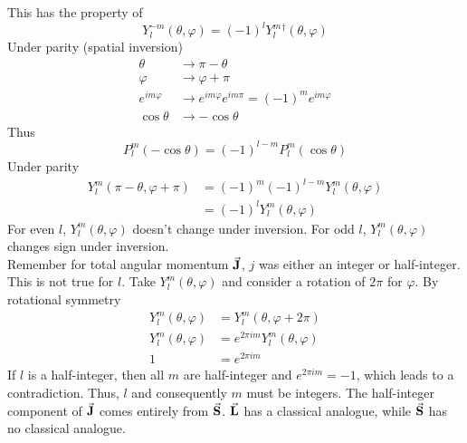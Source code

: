 \documentclass[12pt,a4paper,titlepage]{article}
\begin{document}
This has the property of
\begin{equation}
Y_{l}^{-m}(\theta,\varphi)=(-1)^{l}Y_{l}^{m}{}^{\dagger}(\theta,\varphi)
\end{equation}
Under parity (spatial inversion)
\begin{equation}
\begin{aligned}
\theta&\rightarrow\pi-\theta\\
\varphi&\rightarrow\varphi+\pi\\
e^{im\varphi}&\rightarrow e^{im\varphi}e^{im\pi}=(-1)^{m}e^{im\varphi}\\
\cos\theta&\rightarrow-\cos\theta
\end{aligned}
\end{equation}
Thus
\begin{equation}
P_{l}^{m}(-\cos\theta)=(-1)^{l-m}P_{l}^{m}(\cos\theta)
\end{equation}
Under parity
\begin{equation}
\begin{aligned}
Y_{l}^{m}(\pi-\theta,\varphi+\pi)&=(-1)^{m}(-1)^{l-m}Y_{l}^{m}(\theta,\varphi)\\
&=(-1)^{l}Y_{l}^{m}(\theta,\varphi)
\end{aligned}
\end{equation}
For even $l$, $Y_{l}^{m}(\theta,\varphi)$ doesn't change under inversion. For odd $l$, $Y_{l}^{m}(\theta,\varphi)$ changes sign under inversion.\\

Remember for total angular momentum $\vec{\vb{J}}$, $j$ was either an integer or half-integer. This is not true for $l$. Take $Y_{l}^{m}(\theta,\varphi)$ and consider a rotation of $2\pi$ for $\varphi$. By rotational symmetry
\begin{equation}
\begin{aligned}
Y_{l}^{m}(\theta,\varphi)&=Y_{l}^{m}(\theta,\varphi+2\pi)\\
Y_{l}^{m}(\theta,\varphi)&=e^{2\pi im}Y_{l}^{m}(\theta,\varphi)\\
1&=e^{2\pi im}
\end{aligned}
\end{equation}
If $l$ is a half-integer, then all $m$ are half-integer and $e^{2\pi im}=-1$, which leads to a contradiction. Thus, $l$ and consequently $m$ must be integers. The half-integer component of $\vec{\vb{J}}$ comes entirely from $\vec{\vb{S}}$. $\vec{\vb{L}}$ has a classical analogue, while $\vec{\vb{S}}$ has no classical analogue.

\newpage
\end{document}
